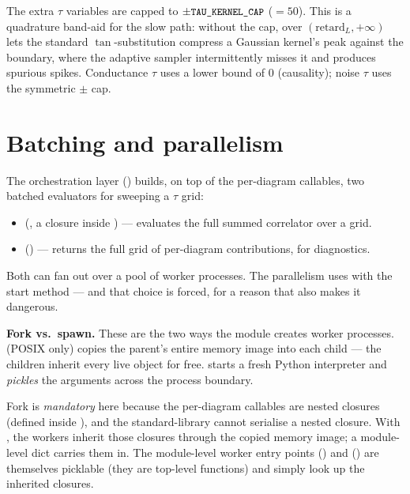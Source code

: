 \begin{gotcha}
The extra $\tau$ variables are capped to $\pm\texttt{\small TAU\_KERNEL\_CAP}$ ($=50$). This
is a quadrature band-aid for the slow path: without the cap, 
over $(\text{retard}_L, +\infty)$ lets the standard $\tan$-substitution compress a
Gaussian kernel's peak against the boundary, where the adaptive sampler
intermittently misses it and produces spurious spikes. Conductance $\tau$ uses a
lower bound of $0$ (causality); noise $\tau$ uses the symmetric $\pm$ cap.
\end{gotcha}

\section{Batching and parallelism}\label{sec:parallel}

The orchestration layer () builds, on top of the per-diagram
callables, two batched evaluators for sweeping a $\tau$ grid:

\begin{itemize}
  \item {}
        (, a closure inside )
        --- evaluates the full summed correlator over a grid.
  \item {} () --- returns
        the full  grid of per-diagram contributions, for
        diagnostics.
\end{itemize}

Both can fan out over a pool of worker processes. The parallelism uses
 with the  start method --- and that choice
is forced, for a reason that also makes it dangerous.

\begin{defn}
\textbf{Fork vs.\ spawn.} These are the two ways the  module
creates worker processes.  (POSIX only) copies the parent's entire
memory image into each child --- the children inherit every live object for free.
 starts a fresh Python interpreter and \emph{pickles} the arguments
across the process boundary.
\end{defn}

Fork is \emph{mandatory} here because the per-diagram 
callables are nested closures (defined inside
), and the standard-library
 cannot serialise a nested closure. With , the workers
inherit those closures through the copied memory image; a module-level
 dict carries them in. The module-level worker entry points
 () and
 () are themselves
picklable (they are top-level functions) and simply look up the inherited
closures.

